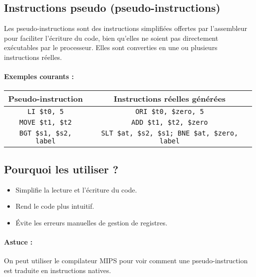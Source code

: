 \documentclass[12pt,a4paper]{article}
\begin{document}
\subsection{Instructions pseudo (pseudo-instructions)}
Les pseudo-instructions sont des instructions simplifiées offertes par l’assembleur pour faciliter l’écriture du code, bien qu'elles ne soient pas directement exécutables par le processeur. Elles sont converties en une ou plusieurs instructions réelles.

\paragraph{Exemples courants :}
\begin{center}
\begin{tabular}{|c|c|}
\hline
\textbf{Pseudo-instruction} & \textbf{Instructions réelles générées} \\
\hline
\texttt{LI \$t0, 5} & \texttt{ORI \$t0, \$zero, 5} \\
\texttt{MOVE \$t1, \$t2} & \texttt{ADD \$t1, \$t2, \$zero} \\
\texttt{BGT \$s1, \$s2, label} & \texttt{SLT \$at, \$s2, \$s1; BNE \$at, \$zero, label} \\
\hline
\end{tabular}
\end{center}

\subsection{Pourquoi les utiliser ?}
\begin{itemize}
  \item Simplifie la lecture et l'écriture du code.
  \item Rend le code plus intuitif.
  \item Évite les erreurs manuelles de gestion de registres.
\end{itemize}

\paragraph{Astuce :} On peut utiliser le compilateur MIPS pour voir comment une pseudo-instruction est traduite en instructions natives.
\end{document}
